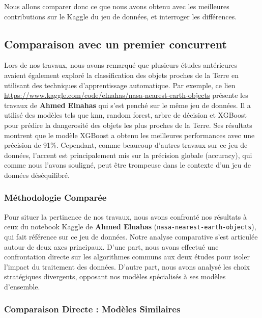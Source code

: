 \documentclass[11pt]{article}
\begin{document}
Nous allons comparer donc ce que nous avons obtenu avec les meilleures
contributions sur le Kaggle du jeu de données, et interroger les
différences.

\subsection{Comparaison avec un premier
  concurrent}\label{comparaison-avec-un-premier-concurrent}

Lors de nos travaux, nous avons remarqué que plusieurs études
antérieures avaient également exploré la classification des objets
proches de la Terre en utilisant des techniques d'apprentissage
automatique. Par exemple, ce lien
\url{https://www.kaggle.com/code/elnahas/nasa-nearest-earth-objects}
présente les travaux de \textbf{Ahmed Elnahas} qui s'est penché sur le
même jeu de données. Il a utilisé des modèles tels que knn, random
forest, arbre de décision et XGBoost pour prédire la dangerosité des
objets les plus proches de la Terre. Ses résultats montrent que le
modèle XGBoost a obtenu les meilleures performances avec une précision
de 91\%. Cependant, comme beaucoup d'autres travaux sur ce jeu de
données, l'accent est principalement mis sur la précision globale
(accuracy), qui comme nous l'avons souligné, peut être trompeuse dans le
contexte d'un jeu de données déséquilibré.

\subsubsection{Méthodologie Comparée}\label{muxe9thodologie-comparuxe9e}

Pour situer la pertinence de nos travaux, nous avons confronté nos
résultats à ceux du notebook Kaggle de \textbf{Ahmed Elnahas}
(\texttt{nasa-nearest-earth-objects}), qui fait référence sur ce jeu de
données. Notre analyse comparative s'est articulée autour de deux axes
principaux. D'une part, nous avons effectué une confrontation directe
sur les algorithmes communs aux deux études pour isoler l'impact du
traitement des données. D'autre part, nous avons analysé les choix
stratégiques divergents, opposant nos modèles spécialisés à ses modèles
d'ensemble.

\subsubsection{Comparaison Directe : Modèles
  Similaires}\label{comparaison-directe-moduxe8les-similaires}
\end{document}
